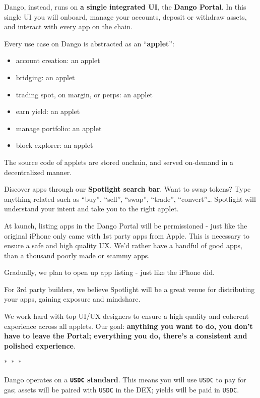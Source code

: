 \documentclass{article}
\newcommand{\separator}{%
  \begin{center}
    $\ast$~$\ast$~$\ast$
  \end{center}
}
\newcommand{\image}[2]{%
  \begin{center}
    \makebox[\textwidth]{ \texttt{[image: \#1]}}%
  \end{center}
  \begin{center}
    \captionsetup{type=figure}
    \captionof{figure}{#2}
  \end{center}
}
\begin{document}
Dango, instead, runs on \textbf{a single integrated UI}, the \textbf{Dango Portal}. In this single UI you will onboard, manage your accounts, deposit or withdraw assets, and interact with every app on the chain.

\image{images/5-applets.jpeg}{Applets}

Every use case on Dango is abstracted as an ``\textbf{applet}'':

\begin{itemize}
  \item account creation: an applet
  \item bridging: an applet
  \item trading spot, on margin, or perps: an applet
  \item earn yield: an applet
  \item manage portfolio: an applet
  \item block explorer: an applet
\end{itemize}

\image{images/6-spotlight-search.jpeg}{Spotlight search}

The source code of applets are stored onchain, and served on-demand in a decentralized manner.

Discover apps through our \textbf{Spotlight search bar}. Want to swap tokens? Type anything related such as ``buy'', ``sell'', ``swap'', ``trade'', ``convert''… Spotlight will understand your intent and take you to the right applet.

At launch, listing apps in the Dango Portal will be permissioned - just like the original iPhone only came with 1st party apps from Apple. This is necessary to ensure a safe and high quality UX. We'd rather have a handful of good apps, than a thousand poorly made or scammy apps.

Gradually, we plan to open up app listing - just like the iPhone did.

For 3rd party builders, we believe Spotlight will be a great venue for distributing your apps, gaining exposure and mindshare.

We work hard with top UI/UX designers to ensure a high quality and coherent experience across all applets. Our goal: \textbf{anything you want to do, you don't have to leave the Portal; everything you do, there's a consistent and polished experience}.

\separator

Dango operates on a \textbf{\texttt{USDC} standard}. This means you will use \texttt{USDC} to pay for gas; assets will be paired with \texttt{USDC} in the DEX; yields will be paid in \texttt{USDC}.
\end{document}
